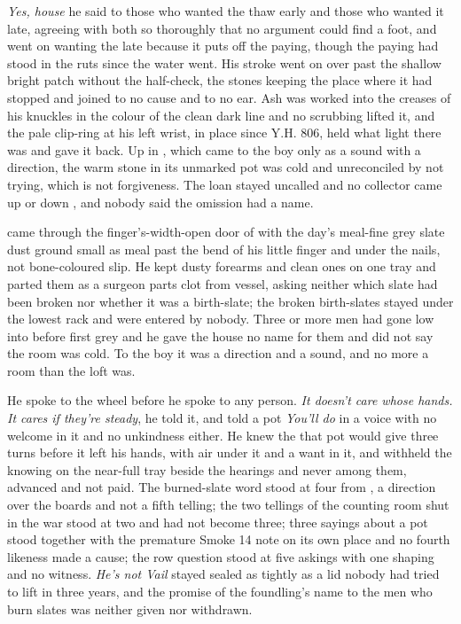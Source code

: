 \emph{Yes, house} he said to those who wanted the thaw early and those who wanted it late, agreeing with both so thoroughly that no argument could find a foot, and went on wanting the late because it puts off the paying, though the paying had stood in the ruts since the water went. His stroke went on over  past the shallow bright patch without the half-check, the stones keeping the place where it had stopped and joined to no cause and to no ear. Ash was worked into the creases of his knuckles in the colour of the clean dark line and no scrubbing lifted it, and the pale clip-ring at his left wrist, in place since Y.H. 806, held what light there was and gave it back. Up in , which came to the boy only as a sound with a direction, the warm stone in its unmarked pot was cold and unreconciled by not trying, which is not forgiveness. The loan stayed uncalled and no collector came up or down , and nobody said the omission had a name.

 came through the finger's-width-open door of  with the day's meal-fine grey slate dust ground small as meal past the bend of his little finger and under the nails, not bone-coloured slip. He kept dusty forearms and clean ones on one tray and parted them as a surgeon parts clot from vessel, asking neither which slate had been broken nor whether it was a birth-slate; the broken birth-slates stayed under the lowest rack and were entered by nobody. Three or more men had gone low into  before first grey and he gave the house no name for them and did not say the room was cold. To the boy it was a direction and a sound, and no more a room than the loft was.

He spoke to the wheel before he spoke to any person. \emph{It doesn't care whose hands. It cares if they're steady}, he told it, and told a pot \emph{You'll do} in a voice with no welcome in it and no unkindness either. He knew the  that pot would give three turns before it left his hands, with air under it and a want in it, and withheld the knowing on the near-full tray beside the hearings and never among them, advanced and not paid. The burned-slate word stood at four from , a direction over the boards and not a fifth telling; the two tellings of the counting room shut in the war stood at two and had not become three; three sayings about a pot stood together with the premature Smoke 14 note on its own place and no fourth likeness made a cause; the row question stood at five askings with one shaping and no witness. \emph{He's not Vail} stayed sealed as tightly as a lid nobody had tried to lift in three years, and the promise of the foundling's name to the men who burn slates was neither given nor withdrawn.

